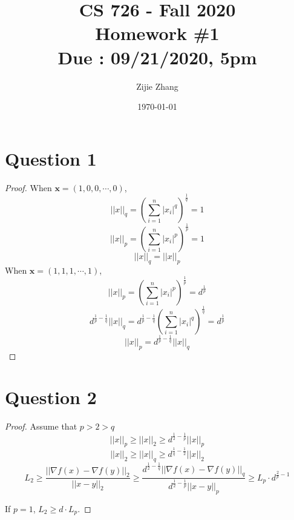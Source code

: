 \documentclass{article}
\title{CS 726 - Fall 2020\\
        {\Large \textbf{Homework \#1}}\\
        {\normalsize \textbf{Due : 09/21/2020, 5pm}}
    }
\author{Zijie Zhang}
\date{\today}
\begin{document}
    \maketitle

\section*{Question 1}
    \begin{proof}
        When $\boldsymbol{x} = (1,0,0,\cdots,0)$,
        $$ ||x||_q = \left(\sum_{i=1}^n|x_i|^q\right)^{\frac{1}{q}} = 1 $$
        $$ ||x||_p = \left(\sum_{i=1}^n|x_i|^p\right)^{\frac{1}{p}} = 1 $$
        $$ ||x||_q = ||x||_p $$
        When $\boldsymbol{x} = (1,1,1,\cdots,1)$,
        $$ ||x||_p = \left(\sum_{i=1}^n|x_i|^p\right)^{\frac{1}{p}} = d^{\frac{1}{p}} $$
        $$ d^{\frac{1}{p}-\frac{1}{q}}||x||_q = d^{\frac{1}{p}-\frac{1}{q}} \left(\sum_{i=1}^n|x_i|^q\right)^{\frac{1}{q}} = d^{\frac{1}{p}} $$
        $$ ||x||_p = d^{\frac{1}{p}-\frac{1}{q}}||x||_q $$
    \end{proof}

\section*{Question 2}
    \begin{proof}
        Assume that $p>2>q$
        $$||x||_p \geqslant ||x||_2 \geqslant d^{\frac{1}{2}-\frac{1}{p}}||x||_p$$
        $$||x||_2 \geqslant ||x||_q \geqslant d^{\frac{1}{q}-\frac{1}{2}}||x||_2$$
        $$L_2\geqslant \frac{||\nabla f(x)-\nabla f(y)||_2}{||x-y||_2} \geqslant \frac{d^{\frac{1}{2}-\frac{1}{q}}||\nabla f(x)-\nabla f(y)||_q}{d^{\frac{1}{2}-\frac{1}{p}}||x-y||_p} \geqslant L_p \cdot d^{\frac{2}{p}-1}$$

        If $p=1$, $L_2 \geqslant d\cdot L_p$.
    \end{proof}

\end{document}
